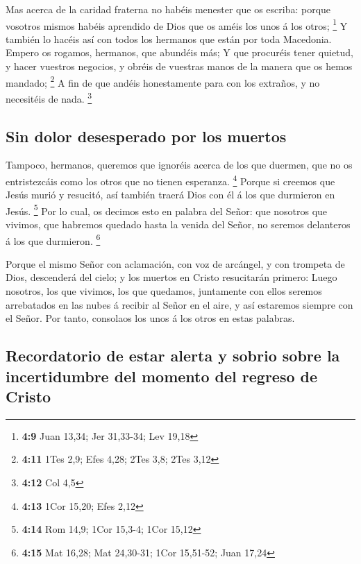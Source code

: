  Mas acerca de la caridad fraterna no habéis menester que os
escriba: porque vosotros mismos habéis aprendido de Dios que os améis
los unos á los otros; \footnote{\textbf{4:9} Juan 13,34; Jer 31,33-34;
  Lev 19,18}  Y también lo hacéis así con todos los
hermanos que están por toda Macedonia. Empero os rogamos, hermanos, que
abundéis más;  Y que procuréis tener quietud, y hacer
vuestros negocios, y obréis de vuestras manos de la manera que os hemos
mandado; \footnote{\textbf{4:11} 1Tes 2,9; Efes 4,28; 2Tes 3,8; 2Tes
  3,12}  A fin de que andéis honestamente para con los
extraños, y no necesitéis de nada. \footnote{\textbf{4:12} Col 4,5}

\hypertarget{sin-dolor-desesperado-por-los-muertos}{%
\subsection{Sin dolor desesperado por los
muertos}\label{sin-dolor-desesperado-por-los-muertos}}

 Tampoco, hermanos, queremos que ignoréis acerca de los que
duermen, que no os entristezcáis como los otros que no tienen esperanza.
\footnote{\textbf{4:13} 1Cor 15,20; Efes 2,12}  Porque si
creemos que Jesús murió y resucitó, así también traerá Dios con él á los
que durmieron en Jesús. \footnote{\textbf{4:14} Rom 14,9; 1Cor 15,3-4;
  1Cor 15,12}  Por lo cual, os decimos esto en palabra del
Señor: que nosotros que vivimos, que habremos quedado hasta la venida
del Señor, no seremos delanteros á los que durmieron. \footnote{\textbf{4:15}
  Mat 16,28; Mat 24,30-31; 1Cor 15,51-52; Juan 17,24}

 Porque el mismo Señor con aclamación, con voz de arcángel,
y con trompeta de Dios, descenderá del cielo; y los muertos en Cristo
resucitarán primero:  Luego nosotros, los que vivimos, los
que quedamos, juntamente con ellos seremos arrebatados en las nubes á
recibir al Señor en el aire, y así estaremos siempre con el Señor.
 Por tanto, consolaos los unos á los otros en estas
palabras.

\hypertarget{recordatorio-de-estar-alerta-y-sobrio-sobre-la-incertidumbre-del-momento-del-regreso-de-cristo}{%
\subsection{Recordatorio de estar alerta y sobrio sobre la incertidumbre
del momento del regreso de
Cristo}\label{recordatorio-de-estar-alerta-y-sobrio-sobre-la-incertidumbre-del-momento-del-regreso-de-cristo}}

